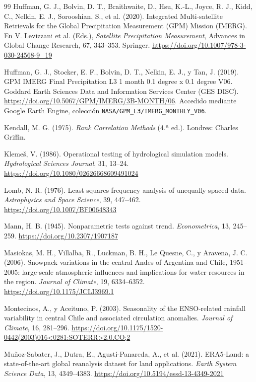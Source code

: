 \documentclass[11pt,a4paper]{article}
\begin{document}
\begin{thebibliography}{99}
 Huffman, G. J., Bolvin, D. T., Braithwaite, D., Hsu, K.-L., Joyce, R. J., Kidd, C., Nelkin, E. J., Sorooshian, S., et al. (2020). Integrated Multi-satellite Retrievals for the Global Precipitation Measurement (GPM) Mission (IMERG). En V. Levizzani et al. (Eds.), \emph{Satellite Precipitation Measurement}, Advances in Global Change Research, 67, 343--353. Springer. \url{https://doi.org/10.1007/978-3-030-24568-9_19}

 Huffman, G. J., Stocker, E. F., Bolvin, D. T., Nelkin, E. J., y Tan, J. (2019). GPM IMERG Final Precipitation L3 1 month 0.1 degree x 0.1 degree V06. Goddard Earth Sciences Data and Information Services Center (GES DISC). \url{https://doi.org/10.5067/GPM/IMERG/3B-MONTH/06}. Accedido mediante Google Earth Engine, colección \texttt{NASA/GPM\_L3/IMERG\_MONTHLY\_V06}.

 Kendall, M. G. (1975). \emph{Rank Correlation Methods} (4.ª ed.). Londres: Charles Griffin.

 Klemeš, V. (1986). Operational testing of hydrological simulation models. \emph{Hydrological Sciences Journal}, 31, 13--24. \url{https://doi.org/10.1080/02626668609491024}

 Lomb, N. R. (1976). Least-squares frequency analysis of unequally spaced data. \emph{Astrophysics and Space Science}, 39, 447--462. \url{https://doi.org/10.1007/BF00648343}

 Mann, H. B. (1945). Nonparametric tests against trend. \emph{Econometrica}, 13, 245--259. \url{https://doi.org/10.2307/1907187}

 Masiokas, M. H., Villalba, R., Luckman, B. H., Le Quesne, C., y Aravena, J. C. (2006). Snowpack variations in the central Andes of Argentina and Chile, 1951--2005: large-scale atmospheric influences and implications for water resources in the region. \emph{Journal of Climate}, 19, 6334--6352. \url{https://doi.org/10.1175/JCLI3969.1}

 Montecinos, A., y Aceituno, P. (2003). Seasonality of the ENSO-related rainfall variability in central Chile and associated circulation anomalies. \emph{Journal of Climate}, 16, 281--296. \url{https://doi.org/10.1175/1520-0442(2003)016<0281:SOTERR>2.0.CO;2}

 Muñoz-Sabater, J., Dutra, E., Agustí-Panareda, A., et al. (2021). ERA5-Land: a state-of-the-art global reanalysis dataset for land applications. \emph{Earth System Science Data}, 13, 4349--4383. \url{https://doi.org/10.5194/essd-13-4349-2021}


\end{thebibliography}
\end{document}

